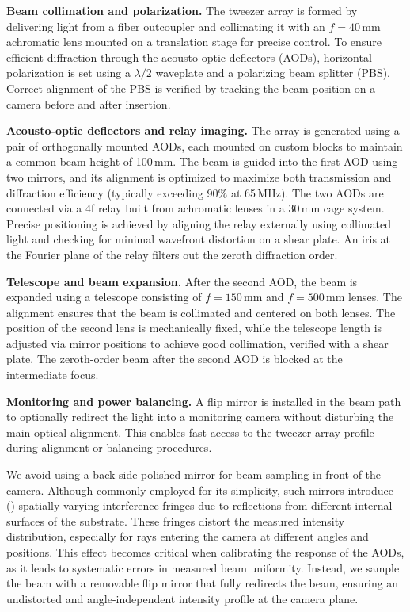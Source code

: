 \textbf{Beam collimation and polarization.} The tweezer array is formed by delivering light from a fiber outcoupler and collimating it with an $f = 40\,\mathrm{mm}$ achromatic lens mounted on a translation stage for precise control. To ensure efficient diffraction through the acousto-optic deflectors (AODs), horizontal polarization is set using a $\lambda/2$ waveplate and a polarizing beam splitter (PBS). Correct alignment of the PBS is verified by tracking the beam position on a camera before and after insertion.

\textbf{Acousto-optic deflectors and relay imaging.} The array is generated using a pair of orthogonally mounted AODs, each mounted on custom blocks to maintain a common beam height of 100\,mm. The beam is guided into the first AOD using two mirrors, and its alignment is optimized to maximize both transmission and diffraction efficiency (typically exceeding 90\% at 65\,MHz). The two AODs are connected via a 4f relay built from achromatic lenses in a 30\,mm cage system. Precise positioning is achieved by aligning the relay externally using collimated light and checking for minimal wavefront distortion on a shear plate. An iris at the Fourier plane of the relay filters out the zeroth diffraction order.

\textbf{Telescope and beam expansion.} After the second AOD, the beam is expanded using a telescope consisting of $f = 150\,\mathrm{mm}$ and $f = 500\,\mathrm{mm}$ lenses. The alignment ensures that the beam is collimated and centered on both lenses. The position of the second lens is mechanically fixed, while the telescope length is adjusted via mirror positions to achieve good collimation, verified with a shear plate. The zeroth-order beam after the second AOD is blocked at the intermediate focus.

\textbf{Monitoring and power balancing.} A flip mirror is installed in the beam path to optionally redirect the light into a monitoring camera without disturbing the main optical alignment. This enables fast access to the tweezer array profile during alignment or balancing procedures.

We avoid using a back-side polished mirror for beam sampling in front of the camera. Although commonly employed for its simplicity, such mirrors introduce () spatially varying interference fringes due to reflections from different internal surfaces of the substrate. These fringes distort the measured intensity distribution, especially for rays entering the camera at different angles and positions. This effect becomes critical when calibrating the response of the AODs, as it leads to systematic errors in measured beam uniformity. Instead, we sample the beam with a removable flip mirror that fully redirects the beam, ensuring an undistorted and angle-independent intensity profile at the camera plane.
